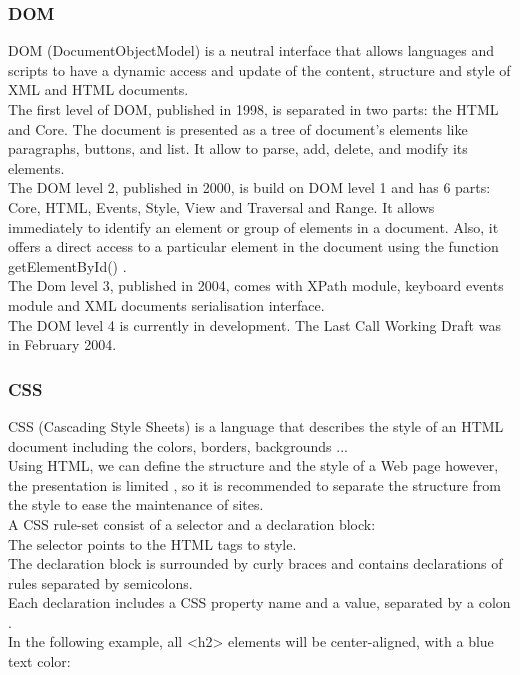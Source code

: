 \subsubsection{DOM}

DOM (DocumentObjectModel) is a neutral interface that allows languages and scripts to have a dynamic access and update of the content, structure and style of XML and HTML documents\cite{dom}. \\
The first level of DOM, published in 1998, is separated in two parts: the HTML and Core. The document is presented as a tree of document's elements like paragraphs, buttons, and list. It allow to parse, add, delete, and modify its elements.  \\ 
The DOM level 2, published in 2000, is build on DOM level 1 and has 6 parts: Core, HTML, Events, Style, View and Traversal and Range. It allows immediately to identify an element or group of elements in a document. Also, it offers a direct access to a particular element in the document using the function getElementById() \cite{dom2}.\\
The Dom level 3, published in 2004, comes with XPath module, keyboard events module and XML documents serialisation interface.\\
The DOM level 4 is currently in development. The Last Call Working Draft was in February 2004. 


\subsubsection{CSS}

CSS (Cascading Style Sheets) is a language that describes the style of an HTML document including the colors, borders, backgrounds ... \\
Using HTML, we can define the structure and the style of a Web page however, the presentation is limited \cite{css} , so it is recommended to separate the structure from the style to ease the maintenance of sites.\\
A CSS rule-set consist of a selector and a declaration block:\\
The selector points to the HTML tags to style.\\ 
The declaration block is surrounded by curly braces and contains declarations of rules separated by semicolons.\\
Each declaration includes a CSS property name and a value, separated by a colon \cite{css2}.\\
In the following example, all <h2> elements will be center-aligned, with a blue text color:

